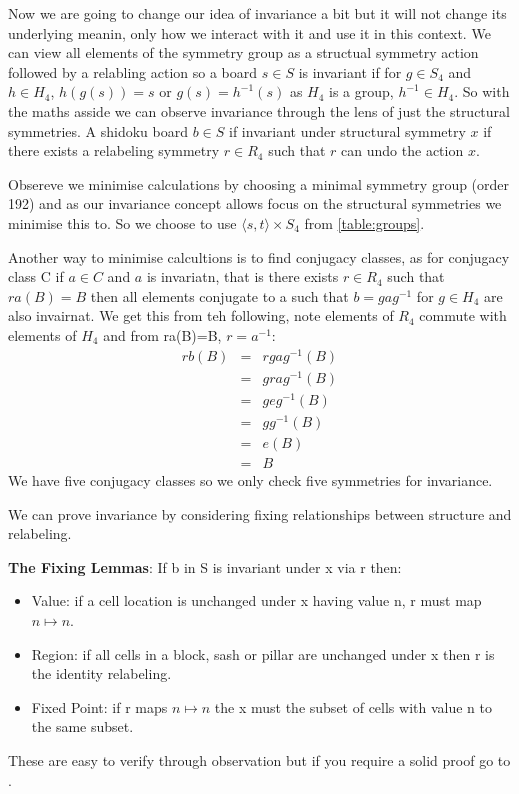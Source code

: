 \documentclass[a4paper,11pt]{report}
\begin{document}
Now we are going to change our idea of invariance a bit but it will not change its underlying meanin, only how we interact with it and use it in this context. We can view all elements of the symmetry group as a structual symmetry action followed by a relabling action so a board $s\in S$ is invariant if for $g\in S_4$ and $h\in H_4$, $h(g(s))=s$ or $g(s)=h^{-1}(s)$ as $H_4 $ is a group, $h^{-1}\in H_4$. So with the maths asside we can observe invariance through the lens of just the structural symmetries. A shidoku board $b\in S$ if invariant under structural symmetry $x$ if there exists a  relabeling symmetry $r\in R_4$ such that $r$ can undo the action $x$.

Obsereve we minimise calculations by choosing a minimal symmetry group (order 192) and as our invariance concept allows focus on the structural symmetries we minimise this to. So we choose to use $\langle s,t \rangle \times S_4$ from \ref{table:groups}.

Another way to minimise calcultions is to find conjugacy classes, as for conjugacy class C if $a\in C$ and $a$ is invariatn, that is there exists $r\in R_4$ such that$ra(B)=B$ then all elements conjugate to a such that $b=gag^{-1}$ for $g\in H_4$ are also invairnat. We get this from teh following, note elements of $R_4$ commute with elements of $H_4$ and from ra(B)=B, $r=a^{-1}$:
\begin{eqnarray}
rb(B)&=&rgag^{-1}(B)\\
&=&grag^{-1}(B)\\
&=&geg^{-1}(B)\\
&=&gg^{-1}(B)\\
&=&e(B)\\
&=&B
\end{eqnarray}
We have five conjugacy classes so we only check five symmetries for invariance. 

We can prove invariance by considering fixing relationships between structure and relabeling. 

\textbf{The Fixing Lemmas}: If b in S is invariant under x via r then:
\begin{itemize}
\item Value: if a cell location is unchanged under x having value n, r must map $n \mapsto n$.
\item Region: if all cells in a block, sash or pillar are unchanged under x then r is the identity relabeling. 
\item Fixed Point: if r maps $n\mapsto n$ the x must the subset of cells with value n to the same subset.
\end{itemize}
These are easy to verify through observation but if you require a solid proof go to \cite{minimal complete shidoku symmetry groups pg 10}.
\end{document}
